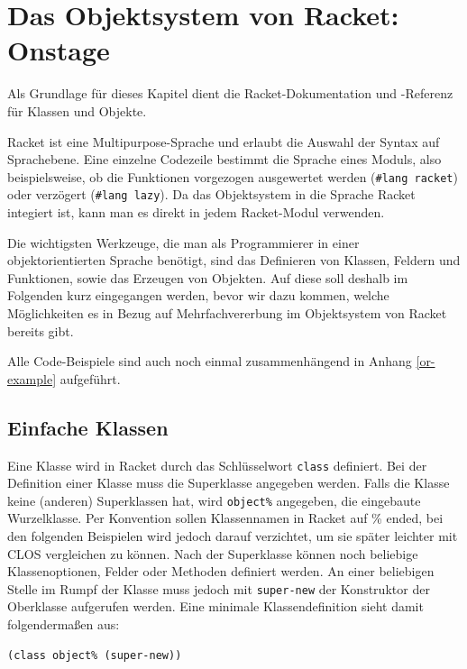 \section{Das Objektsystem von Racket: Onstage}
Als Grundlage für dieses Kapitel dient die Racket-Dokumentation \cite{racketguide-classes} und -Referenz \cite{racketref-classes} für Klassen und Objekte.

Racket ist eine Multipurpose-Sprache und erlaubt die Auswahl der Syntax auf Sprachebene. Eine einzelne Codezeile bestimmt die Sprache eines Moduls, also beispielsweise, ob die Funktionen vorgezogen ausgewertet werden (\texttt{\#lang racket}) oder verzögert (\texttt{\#lang lazy}). Da das Objektsystem in die Sprache Racket integiert ist, kann man es direkt in jedem Racket-Modul verwenden.


Die wichtigsten Werkzeuge, die man als Programmierer in einer objektorientierten Sprache benötigt, sind das Definieren von Klassen, Feldern und Funktionen, sowie das Erzeugen von Objekten. Auf diese soll deshalb im Folgenden kurz eingegangen werden, bevor wir dazu kommen, welche Möglichkeiten es in Bezug auf Mehrfachvererbung im Objektsystem von Racket bereits gibt.

Alle Code-Beispiele sind auch noch einmal zusammenhängend in Anhang \ref{or-example} aufgeführt. 

\subsection{Einfache Klassen}

Eine Klasse wird in Racket durch das Schlüsselwort \texttt{class} definiert. Bei der Definition einer Klasse muss die Superklasse angegeben werden. Falls die Klasse keine (anderen) Superklassen hat, wird \texttt{object\%} angegeben, die eingebaute Wurzelklasse. Per Konvention sollen Klassennamen in Racket auf \% ended, bei den folgenden Beispielen wird jedoch darauf verzichtet, um sie später leichter mit CLOS vergleichen zu können. Nach der Superklasse können noch beliebige Klassenoptionen, Felder oder Methoden definiert werden. An einer beliebigen Stelle im Rumpf der Klasse muss jedoch mit \texttt{super-new} der Konstruktor der Oberklasse aufgerufen werden. Eine minimale Klassendefinition sieht damit folgendermaßen aus:

\begin{lstlisting}
(class object% (super-new))
\end{lstlisting}

